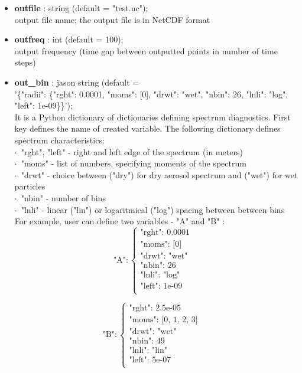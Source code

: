 \documentclass[11pt]{article}
\begin{document}
\begin{itemize}
  \item \textbf{outfile} : string (default = "test.nc"); \\ output file name; the output file is in NetCDF format
  \item \textbf{outfreq} : int (default = 100); \\ output frequency (time gap between outputted points in number of time steps)
  \item \textbf{out\_bin} : jason string (default =\\ '\{"radii": \{"rght": 0.0001, "moms": [0], "drwt": "wet", "nbin": 26, "lnli": "log", "left": 1e-09\}\}');\\

    \vspace{-.9em}
    It is a Python dictionary of dictionaries defining spectrum diagnostics.
    First key defines the name of created variable. The following dictionary defines spectrum characteristics:\\
      \indent $\cdot$\ "rght", "left" - right and left edge of the spectrum (in meters)\\
      \indent $\cdot$\ "moms" - list of numbers, specifying moments of the spectrum\\
      \indent $\cdot$\ "drwt" - choice between  ("dry") for dry aerosol spectrum and ("wet") for wet particles\\
      \indent $\cdot$\ "nbin" - number of bins\\
      \indent $\cdot$\ "lnli" - linear ("lin") or logaritmical ("log") spacing between between bins\\
 
    \vspace{-.9em}
    For example, user can define two variables - "A" and "B" : \\ 
  
$$
\mbox{"A"}: \left\{ \begin{array}{ll}
\mbox{"rght": 0.0001}  & \textrm{}\\
\mbox{"moms": [0]}  & \textrm{}\\
\mbox{"drwt": "wet"} & \textrm{}\\
\mbox{"nbin": 26} & \textrm{}\\
\mbox{"lnli": "log"}  & \textrm{}\\
\mbox{"left": 1e-09} & \textrm{}\\
\end{array} \right.
$$

$$
\mbox{"B"}: \left\{ \begin{array}{ll}
\mbox{"rght": 2.5e-05} & \textrm{}\\
\mbox{"moms": [0, 1, 2, 3] } & \textrm{}\\
\mbox{"drwt": "wet"} & \textrm{}\\
\mbox{"nbin": 49} & \textrm{}\\
\mbox{"lnli": "lin"} & \textrm{}\\
\mbox{"left": 5e-07} & \textrm{}\\
\end{array} \right.
$$
 

\end{itemize}
\end{document}
